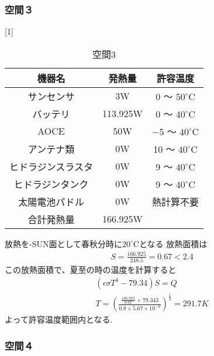 \subsubsection{空間３}
\begin{table}[H]
  \begin{center}
  \caption{空間3}
  \scalebox{1}[1]{
  \begin{tabular}{|c|c|c|} \hline
    機器名 &  発熱量 & 許容温度 \\ \hline

  サンセンサ
  & 3W
  & 0 〜 ${50}^\circ\mathrm{C}$\\

  バッテリ
  & 113.925W
  & 0 〜 ${40}^\circ\mathrm{C}$\\

  AOCE
  & 50W
  & $-5$ 〜 ${40}^\circ\mathrm{C}$\\

  アンテナ類
  & 0W
  & 10 〜 ${40}^\circ\mathrm{C}$\\

  ヒドラジンスラスタ
  & 0W
  & 9 〜 ${40}^\circ\mathrm{C}$\\

  ヒドラジンタンク
  & 0W
  & 9 〜 ${40}^\circ\mathrm{C}$\\

  太陽電池パドル
  & 0W
  &  熱計算不要\\ \hline

  合計発熱量
  & 166.925W
  & \\\hline
  \end{tabular}
  }
\end{center}
\end{table}
放熱を-SUN面として春秋分時に${20}^\circ\mathrm{C}$となる
放熱面積は
\begin{eqnarray}
  S=\frac{166.925}{248.5}=0.67<2.4
\end{eqnarray}
この放熱面積で、夏至の時の温度を計算すると
\begin{eqnarray}
  (\epsilon\sigma T^4 -79.34)S=Q\\
  T =(\frac{\frac{166.925}{0.67}+79.343}
  {0.8\times5.67\times10^{-8}})^{\frac{1}{4}}=291.7K
\end{eqnarray}
よって許容温度範囲内となる.

\subsubsection{空間４}

